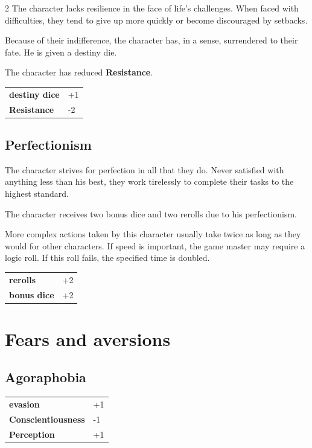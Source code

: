 \begin{multicols}{2}
    The character lacks resilience in the face of life's challenges. When faced with difficulties, they tend to give up more quickly or become discouraged by setbacks.

    Because of their indifference, the character has, in a sense, surrendered to their fate. He is given a destiny die.

    The character has reduced \textbf{Resistance}.

    \begin{tabular}{@{}ll@{}}
        \textbf{destiny dice} & +1\\
        \textbf{Resistance} & -2\\
    \end{tabular}

    \subsection*{Perfectionism}

    The character strives for perfection in all that they do. Never satisfied with anything less than his best, they work tirelessly to complete their tasks to the highest standard.

    The character receives two bonus dice and two rerolls due to his perfectionism.

    More complex actions taken by this character usually take twice as long as they would for other characters. If speed is important, the game master may require a logic roll. If this roll fails, the specified time is doubled.

    \begin{tabular}{@{}ll@{}}
        \textbf{rerolls} & +2\\
        \textbf{bonus dice} & +2\\
    \end{tabular}

    \section{Fears and aversions}

    \subsection*{Agoraphobia}




    \begin{tabular}{@{}ll@{}}
        \textbf{evasion} & +1\\
        \textbf{Conscientiousness} & -1\\
        \textbf{Perception} & +1\\
    \end{tabular}


\end{multicols}
